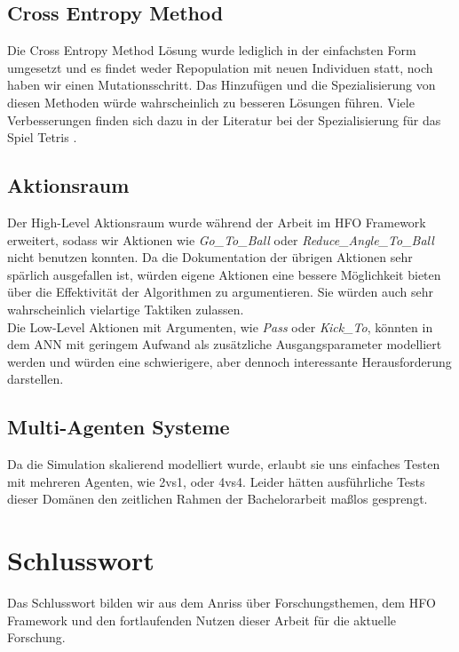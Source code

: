 
        \subsection*{Cross Entropy Method}
            Die Cross Entropy Method Lösung wurde lediglich in der einfachsten Form umgesetzt und es findet weder Repopulation mit neuen Individuen statt, noch haben wir einen Mutationsschritt. Das Hinzufügen und die Spezialisierung von diesen Methoden würde wahrscheinlich zu besseren Lösungen führen. Viele Verbesserungen finden sich dazu in der Literatur bei der Spezialisierung für das Spiel Tetris \cite{cem}.

        \subsection*{Aktionsraum}
            Der High-Level Aktionsraum wurde während der Arbeit im HFO Framework erweitert, sodass wir Aktionen wie \textit{Go\_To\_Ball} oder \textit{Reduce\_Angle\_To\_Ball} nicht benutzen konnten. Da die Dokumentation der übrigen Aktionen sehr spärlich ausgefallen ist, würden eigene Aktionen eine bessere Möglichkeit bieten über die Effektivität der Algorithmen zu argumentieren. Sie würden auch sehr wahrscheinlich vielartige Taktiken zulassen. \\

            \noindent
            Die Low-Level Aktionen mit Argumenten, wie \textit{Pass} oder \textit{Kick\_To}, könnten in dem ANN mit geringem Aufwand als zusätzliche Ausgangsparameter modelliert werden und würden eine schwierigere, aber dennoch interessante Herausforderung darstellen.


        \subsection*{Multi-Agenten Systeme}
            Da die Simulation skalierend modelliert wurde, erlaubt sie uns einfaches Testen mit mehreren Agenten, wie 2vs1, oder 4vs4. Leider hätten ausführliche Tests dieser Domänen den zeitlichen Rahmen der Bachelorarbeit maßlos gesprengt. 

\newpage

    \section{Schlusswort}
        Das Schlusswort bilden wir aus dem Anriss über Forschungsthemen, dem HFO Framework und den fortlaufenden Nutzen dieser Arbeit für die aktuelle Forschung.

